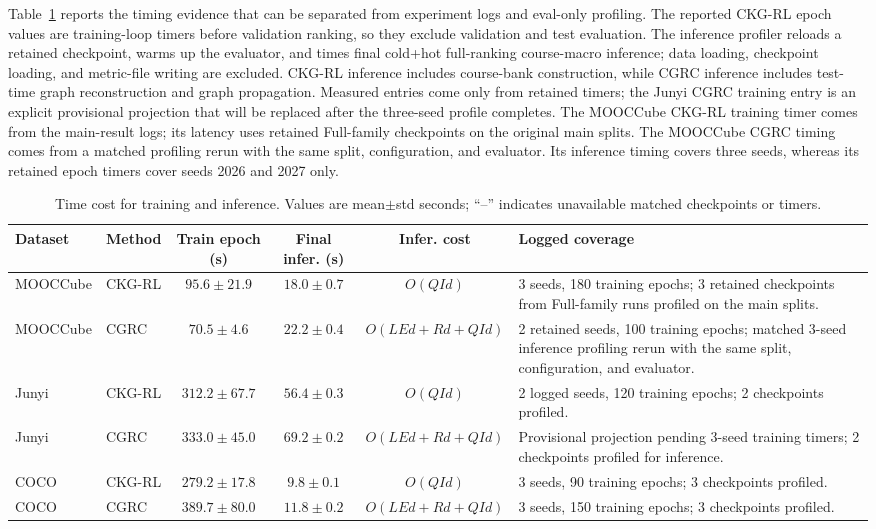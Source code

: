 \documentclass[letterpaper]{article}
\newcommand{\tablecaptiongap}{\vspace{0.35em}}
\begin{document}
Table~\ref{tab:supp-runtime} reports the timing evidence that can be separated
from experiment logs and eval-only profiling. The reported CKG-RL epoch values
are training-loop timers before validation ranking, so they exclude validation
and test evaluation. The inference profiler reloads a retained checkpoint, warms
up the evaluator, and times final cold+hot full-ranking course-macro inference;
data loading, checkpoint loading, and metric-file writing are excluded. CKG-RL
inference includes course-bank construction, while CGRC inference includes
test-time graph reconstruction and graph propagation. Measured entries come
only from retained timers; the Junyi CGRC training entry is an explicit
provisional projection that will be replaced after the three-seed profile completes.
The MOOCCube CKG-RL
training timer comes from the main-result logs; its latency uses retained
Full-family checkpoints on the original main splits. The MOOCCube CGRC timing
comes from a matched profiling rerun with the same split, configuration, and
evaluator. Its inference timing covers three seeds, whereas its retained epoch
timers cover seeds 2026 and 2027 only.

\begin{table}[t]
\centering
\caption{Time cost for training and inference. Values are mean\(\pm\)std seconds; ``--'' indicates unavailable matched checkpoints or timers.}
\label{tab:supp-runtime}
\tablecaptiongap
\small
\setlength{\tabcolsep}{3.2pt}
\renewcommand{\arraystretch}{1.08}
\begin{tabular}{llcccp{4.5cm}}
\toprule
Dataset & Method & Train epoch (s) & Final infer. (s) & Infer. cost & Logged coverage \\
\midrule
MOOCCube & CKG-RL & \(95.6\pm21.9\) & \(18.0\pm0.7\) & \(O(QId)\) & 3 seeds, 180 training epochs; 3 retained checkpoints from Full-family runs profiled on the main splits. \\
MOOCCube & CGRC & \(70.5\pm4.6\) & \(22.2\pm0.4\) & \(O(LEd+Rd+QId)\) & 2 retained seeds, 100 training epochs; matched 3-seed inference profiling rerun with the same split, configuration, and evaluator. \\
Junyi & CKG-RL & \(312.2\pm67.7\) & \(56.4\pm0.3\) & \(O(QId)\) & 2 logged seeds, 120 training epochs; 2 checkpoints profiled. \\
Junyi & CGRC & \(333.0\pm45.0\) & \(69.2\pm0.2\) & \(O(LEd+Rd+QId)\) & Provisional projection pending 3-seed training timers; 2 checkpoints profiled for inference. \\
COCO & CKG-RL & \(279.2\pm17.8\) & \(9.8\pm0.1\) & \(O(QId)\) & 3 seeds, 90 training epochs; 3 checkpoints profiled. \\
COCO & CGRC & \(389.7\pm80.0\) & \(11.8\pm0.2\) & \(O(LEd+Rd+QId)\) & 3 seeds, 150 training epochs; 3 checkpoints profiled. \\
\bottomrule
\end{tabular}
\end{table}
\end{document}
